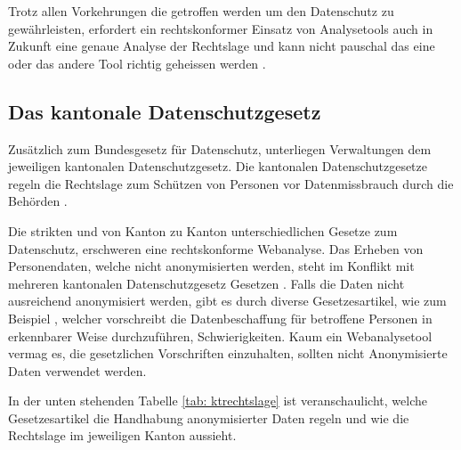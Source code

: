 Trotz allen Vorkehrungen die getroffen werden um den Datenschutz zu gewährleisten, erfordert ein rechtskonformer Einsatz von Analysetools auch in Zukunft eine genaue Analyse der Rechtslage und kann nicht pauschal das eine oder das andere Tool richtig geheissen werden \parencite[S. 6]{EcommerceUndDatenschutz}.

\subsection{Das kantonale Datenschutzgesetz}
Zusätzlich zum Bundesgesetz für Datenschutz, unterliegen Verwaltungen dem jeweiligen kantonalen Datenschutzgesetz. Die kantonalen Datenschutzgesetze regeln die Rechtslage zum Schützen von Personen vor Datenmissbrauch durch die Behörden \parencite[Vgl. §§ 1 Abs. 1]{DSSGBERN}. 

Die strikten und von Kanton zu Kanton unterschiedlichen Gesetze zum Datenschutz, erschweren eine rechtskonforme Webanalyse. Das Erheben von Personendaten, welche nicht anonymisierten werden, steht im Konflikt mit mehreren kantonalen Datenschutzgesetz Gesetzen \parencite[Vgl. §§ 15 Abs. 1]{DSSGBERN}. Falls die Daten nicht ausreichend anonymisiert werden, gibt es durch diverse Gesetzesartikel, wie zum Beispiel \parencite[§§ 7 Abs. 1]{DSSGGL}, welcher vorschreibt die Datenbeschaffung für betroffene Personen in erkennbarer Weise durchzuführen, Schwierigkeiten. Kaum ein Webanalysetool vermag es, die gesetzlichen Vorschriften einzuhalten, sollten nicht Anonymisierte Daten verwendet werden.

In der unten stehenden Tabelle \ref{tab: ktrechtslage} ist veranschaulicht, welche Gesetzesartikel die Handhabung anonymisierter Daten regeln und wie die Rechtslage im jeweiligen Kanton aussieht.

